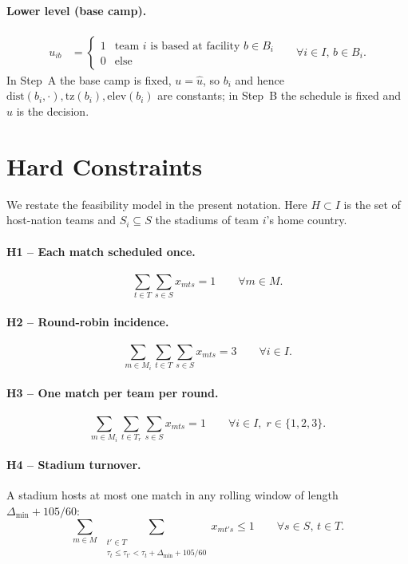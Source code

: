 \documentclass[12pt, letterpaper]{article}
\newcommand{\dist}{\mathrm{dist}}
\newcommand{\elev}{\mathrm{elev}}
\newcommand{\tzone}{\mathrm{tz}}
\begin{document}
\paragraph{Lower level (base camp).}
\begin{align}
u_{ib} &=
  \begin{cases} 1 & \text{team } i \text{ is based at facility }
    b\in B_i\\ 0 & \text{else}\end{cases}
  &&\forall i\in I,\,b\in B_i.
\end{align}
In Step~A the base camp is fixed, $u=\hat u$, so $b_i$ and hence
$\dist(b_i,\cdot),\tzone(b_i),\elev(b_i)$ are constants; in Step~B the
schedule is fixed and $u$ is the decision.

\section{Hard Constraints}
We restate the feasibility model in the present notation. Here $H\subset
I$ is the set of host-nation teams and $S_i\subseteq S$ the stadiums of
team $i$'s home country.

\paragraph{H1 -- Each match scheduled once.}
\begin{equation}
\sum_{t\in T}\sum_{s\in S} x_{mts}=1 \qquad\forall m\in M.
\end{equation}
\paragraph{H2 -- Round-robin incidence.}
\begin{equation}
\sum_{m\in M_i}\sum_{t\in T}\sum_{s\in S} x_{mts}=3 \qquad\forall i\in I.
\end{equation}
\paragraph{H3 -- One match per team per round.}
\begin{equation}
\sum_{m\in M_i}\sum_{t\in T_r}\sum_{s\in S} x_{mts}=1
  \qquad\forall i\in I,\;r\in\{1,2,3\}.
\end{equation}
\paragraph{H4 -- Stadium turnover.} A stadium hosts at most one match in
any rolling window of length $\Delta_{\min}+105/60$:
\begin{equation}
\sum_{m\in M}\;\sum_{\substack{t'\in T\\
  \tau_t\le\tau_{t'}<\tau_t+\Delta_{\min}+105/60}}
  x_{mt's}\le 1 \qquad\forall s\in S,\,t\in T.
\end{equation}
\end{document}
